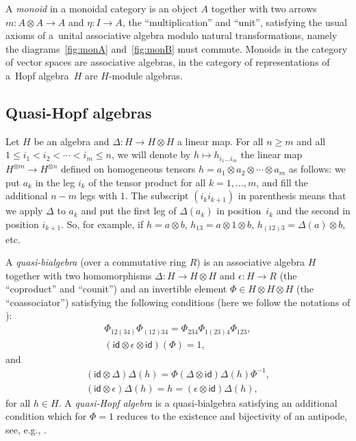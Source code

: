 \documentclass[10pt,a4paper]{amsart}
\numberwithin{equation}{section}
\theoremstyle{definition}
\newcommand{\id}{\mathsf{id}}
\begin{document}
A \emph{monoid} \cite[Section~VII.3]{ML98} in a monoidal category is an object $A$ together with two arrows \mbox{$m\colon A\otimes A\to A$} and $\eta\colon I\to A$, the ``multiplication'' and ``unit'',
satisfying the usual axioms of a~unital associative algebra modulo natural transformations, namely the diagrams~\ref{fig:monA} and~\ref{fig:monB} must commute. Monoids in the category of vector spaces are associative algebras, in the category of representations of a~Hopf algebra~$H$ are $H$-module algebras.

\subsection{Quasi-Hopf algebras}\label{sec:2.2}

Let $H$ be an algebra and $\Delta\colon H\to H\otimes H$ a linear map.
For all $n\geq m$ and all $1\leq i_1<i_2<\cdots<i_m\leq n$, we will denote by $h\mapsto h_{i_1\ldots i_m}$ the
linear map $H^{\otimes m}\to H^{\otimes n}$ def\/ined on homogeneous tensors
$h=a_1\otimes a_2 \otimes\cdots\otimes a_m$ as follows: we put $a_k$ in the leg
$i_k$ of the tensor product for all $k=1,\ldots, m$, and f\/ill the additional
$n-m$ legs with $1$. The subscript $(i_ki_{k+1})$ in parenthesis means
that we apply $\Delta$ to $a_k$ and put the f\/irst leg of $\Delta(a_k)$ in position~$i_k$ and the second in position $i_{k+1}$.
So, for example, if $h=a\otimes b$, $h_{13}=a\otimes 1\otimes b$,
$h_{(12)3}=\Delta(a)\otimes b$, etc.

A \emph{quasi-bialgebra} (over a commutative ring $R$) is an associative algebra $H$ together with two homomorphisms $\Delta\colon H\to H\otimes H$ and $\epsilon\colon H\to R$ (the ``coproduct'' and ``counit'') and an invertible element $\Phi\in H\otimes H\otimes H$ (the ``coassociator'') satisfying the following conditions (here we follow the notations of \cite{Dri90,Dri91}):
\begin{gather}
\Phi_{12(34)}\Phi_{(12)34} = \Phi_{234}\Phi_{1(23)4}\Phi_{123} ,\label{eq:pent} \\
(\id\otimes\epsilon\otimes\id )(\Phi)=1 ,\label{eq:counitality}
\end{gather}
and
\begin{gather}
(\id\otimes\Delta)\Delta(h) =\Phi
(\Delta\otimes\id)\Delta(h)\Phi^{-1} , \label{eq:quasicoass} \\
(\id\otimes\epsilon)\Delta(h) =h=(\epsilon\otimes\id)\Delta(h) ,\nonumber
\end{gather}
for all $h\in H$.
A \emph{quasi-Hopf algebra} is a quasi-bialgebra satisfying an additional condition which for $\Phi=1$ reduces to the existence and bijectivity of an antipode, see, e.g., \cite[Def\/inition~16.1.1]{CP94}.
\end{document}
